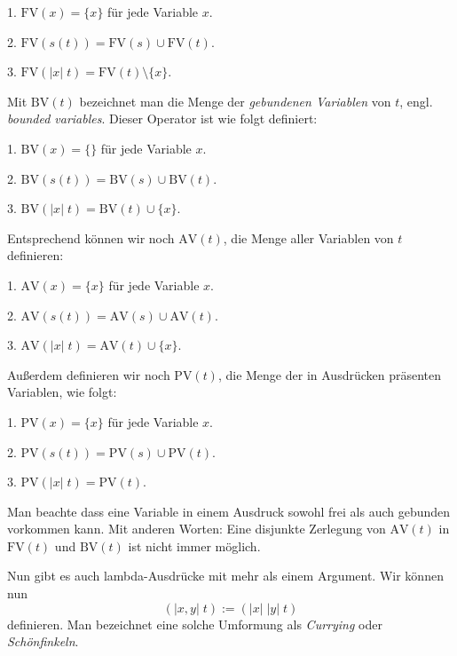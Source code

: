 \documentclass[a4paper,11pt,fleqn,twocolumn,twoside]{article}
\numberwithin{equation}{section}
\begin{document}
1. $\mathrm{FV}(x) = \{x\}$ für jede Variable $x$.

2. $\mathrm{FV}(s(t)) = \mathrm{FV}(s)\cup\mathrm{FV}(t)$.

3. $\mathrm{FV}(|x|\; t) = \mathrm{FV}(t)\setminus\{x\}$.

\noindent
Mit $\mathrm{BV}(t)$ bezeichnet man die Menge der \emph{gebundenen
Variablen} von $t$, engl. \emph{bounded variables}.
Dieser Operator ist wie folgt definiert:

1. $\mathrm{BV}(x) = \{\}$ für jede Variable $x$.

2. $\mathrm{BV}(s(t)) = \mathrm{BV}(s)\cup\mathrm{BV}(t)$.

3. $\mathrm{BV}(|x|\; t) = \mathrm{BV}(t)\cup\{x\}$.

\noindent
Entsprechend können wir noch $\mathrm{AV}(t)$, die Menge aller
Variablen von $t$ definieren:

1. $\mathrm{AV}(x) = \{x\}$ für jede Variable $x$.

2. $\mathrm{AV}(s(t)) = \mathrm{AV}(s)\cup\mathrm{AV}(t)$.

3. $\mathrm{AV}(|x|\; t) = \mathrm{AV}(t)\cup\{x\}$.

\newpage

\noindent
Außerdem definieren wir noch $\mathrm{PV}(t)$, die Menge der
in Ausdrücken präsenten Variablen, wie folgt:

1. $\mathrm{PV}(x) = \{x\}$ für jede Variable $x$.

2. $\mathrm{PV}(s(t)) = \mathrm{PV}(s)\cup\mathrm{PV}(t)$.

3. $\mathrm{PV}(|x|\; t) = \mathrm{PV}(t)$.

\noindent
Man beachte dass eine Variable in einem Ausdruck sowohl
frei als auch gebunden vorkommen kann. Mit anderen
Worten: Eine disjunkte Zerlegung von $\mathrm{AV}(t)$
in $\mathrm{FV}(t)$ und $\mathrm{BV}(t)$ ist nicht immer möglich.

Nun gibt es auch lambda-Ausdrücke mit mehr als einem Argument.
Wir können nun
\begin{equation}
(|x,y|\; t) := (|x|\;|y|\;t)
\end{equation}
definieren. Man bezeichnet eine solche Umformung als \emph{Currying}
oder \emph{Schönfinkeln}.
\end{document}
